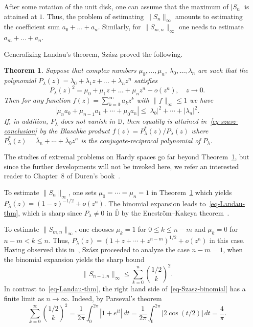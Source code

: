\documentclass[12pt]{amsart}
\newtheorem{theorem}{Theorem}[section]
\theoremstyle{definition}
\theoremstyle{remark}
\numberwithin{equation}{section}
\begin{document}
After some rotation of the unit disk, one can assume that the maximum of $|S_n|$ is attained at $1$. Thus, the problem of estimating $\|S_n\|_\infty$ amounts to estimating the coefficient sum $a_0+\dots+a_n$. Similarly, for $\|S_{m, n}\|_\infty$ one needs to estimate $a_m+\dots +a_n$. 

Generalizing Landau's theorem, Sz\'{a}sz proved the following.

\begin{theorem} \label{thm-szasz} \cite[Satz I]{Szasz1918}
Suppose that complex numbers $\mu_0,\dots, \mu_n$, $\lambda_0,\dots,\lambda_n$ are such that the polynomial $P_\lambda(z) = \lambda_0+\lambda_1 z+ \dots +\lambda_n z^n$ satisfies
\begin{equation}\label{eq-szasz-assumption}
P_\lambda(z)^2 
= \mu_0 + \mu_1 z + \dots + \mu_n z^n + o(z^{n}),\quad z\to 0.
\end{equation}
Then for any function $f(z)=\sum_{k=0}^\infty a_kz^k$ with $\|f\|_\infty \le 1$ we have  
\begin{equation}\label{eq-szasz-conclusion}
|\mu_n a_0 + \mu_{n-1}a_1+ \cdots + \mu_0 a_n|\le 
|\lambda_0|^2 + \cdots + |\lambda_n|^2.
\end{equation}
If, in addition, $P_\lambda$ does not vanish in $\mathbb D$, then equality is attained in~\eqref{eq-szasz-conclusion} by the Blaschke product 
$f(z) = P_\lambda^*(z)/P_\lambda(z)$ where $P_\lambda^*(z) = \bar \lambda_n + \cdots +\bar \lambda_0 z^n$ is the conjugate-reciprocal polynomial of $P_\lambda$. 
\end{theorem}

The studies of extremal problems on Hardy spaces go far beyond Theorem~\ref{thm-szasz}, but since the further developments will not be invoked here, we refer an interested reader to Chapter~8 of Duren's book~\cite{Duren}.

To estimate $\|S_n\|_\infty$, one sets $\mu_0=\cdots = \mu_n=1$ in Theorem~\ref{thm-szasz} which yields $P_\lambda(z)=(1-z)^{-1/2} + o(z^{n})$. The binomial expansion leads to~\eqref{eq-Landau-thm}, which is sharp since $P_\lambda\ne 0$ in $\overline{\mathbb D}$ by the Enestr\"om–Kakeya theorem~\cite{GardnerGovil}. 

To estimate $\|S_{m, n}\|_\infty$, one chooses $\mu_k=1$ for $0\le k\le n-m$ and $\mu_k=0$ for $n-m<k\le n$. Thus, $P_\lambda(z)=(1+z+\cdots +z^{n-m})^{1/2} + o(z^{n})$ in this case. Having observed this in~\cite[\S7]{Szasz1918}, Sz\'{a}sz proceeded to analyze the case $n-m=1$, when the binomial expansion yields the sharp bound~\cite[Satz II]{Szasz1918}  
\begin{equation}\label{eq-Szasz-binomial} 
\|S_{n-1,n}\|_\infty \le \sum_{k=0}^n \binom{1/2}{k}^2.     
\end{equation}
In contrast to~\eqref{eq-Landau-thm}, the right hand side of~\eqref{eq-Szasz-binomial} has a finite limit as $n\to\infty$. Indeed, by Parseval's theorem 
\[
\sum_{k=0}^\infty \binom{1/2}{k}^2 = 
\frac{1}{2\pi} \int_0^{2\pi} |1+e^{it}|\,dt
= \frac{1}{2\pi} \int_0^{2\pi} |2\cos (t/2)|\,dt = \frac{4}{\pi}.
\] 
\end{document}
